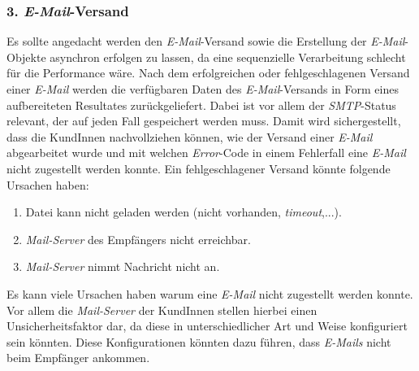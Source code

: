 \subsubsection{3. \emph{E-Mail}-Versand}
Es sollte angedacht werden den \emph{E-Mail}-Versand sowie die Erstellung der \emph{E-Mail}-Objekte asynchron erfolgen zu lassen, da eine sequenzielle Verarbeitung schlecht für die Performance wäre. Nach dem erfolgreichen oder fehlgeschlagenen Versand einer \emph{E-Mail} werden die verfügbaren Daten des \emph{E-Mail}-Versands in Form eines aufbereiteten Resultates zurückgeliefert. Dabei ist vor allem der \emph{SMTP}-Status relevant, der auf jeden Fall gespeichert werden muss. Damit wird sichergestellt, dass die KundInnen nachvollziehen können, wie der Versand einer \emph{E-Mail} abgearbeitet wurde und mit welchen \emph{Error}-Code in einem Fehlerfall eine \emph{E-Mail} nicht zugestellt werden konnte. Ein fehlgeschlagener Versand könnte folgende Ursachen haben:
\begin{enumerate}
	\item Datei kann nicht geladen werden (nicht vorhanden, \emph{timeout},...).
	\item \emph{Mail-Server} des Empfängers nicht erreichbar.
	\item \emph{Mail-Server} nimmt Nachricht nicht an.
\end{enumerate}
Es kann viele Ursachen haben warum eine \emph{E-Mail} nicht zugestellt werden konnte. Vor allem die \emph{Mail-Server} der KundInnen stellen hierbei einen Unsicherheitsfaktor dar, da diese in unterschiedlicher Art und Weise konfiguriert sein könnten. Diese Konfigurationen könnten dazu führen, dass \emph{E-Mails} nicht beim Empfänger ankommen.

\newpage
